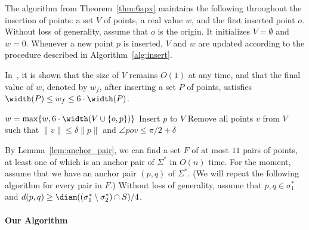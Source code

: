 \sixapx*




The algorithm from Theorem~\ref{thm:6apx} maintains the following throughout the insertion of points: a set $V$ of points, a real value $w$, and the first inserted point $o$.
Without loss of generality, assume that $o$ is the origin.
It initializes $V = \emptyset$ and $w = 0$.
Whenever a new point $p$ is inserted, $V$ and $w$ are updated according to the procedure described in Algorithm~\ref{alg:insert}.

In~\cite{chan2006faster}, it is shown that the size of $V$ remains $O(1)$ at any time, and that the final value of $w$, denoted by $w_f$, after inserting a set $P$ of points, satisfies $\width(P) \le w_f \le 6 \cdot \width(P)$.


\begin{algorithm}
\caption{Processing a new point $p$ (See the proof of Theorem A.3 in \cite{chan2006faster}. Let $\delta>0$ be a sufficiently small constant.)}
\label{alg:insert}
\begin{algorithmic}[1]
\State $w = \max \{w, 6\cdot \width(V \cup \{ o, p\} ) \}$ 
    \State Insert $p$ to $V$
    \State Remove all points $v$ from $V$ such that $\|v\| \le \delta \|p\|$ and $\angle pov \le \pi/2 + \delta$
\EndIf
\EndFunction
\end{algorithmic}
\end{algorithm}


\medbreak
By Lemma~\ref{lem:anchor_pair}, we can find a set $F$ of at most $11$ pairs of points, at least one of which is an anchor pair of $\Sigma^*$ in $O(n)$ time. 
For the moment, assume that we have an anchor pair $(p, q)$ of $\Sigma^*$. (We will repeat the following algorithm for every pair in $F$.)
Without loss of generality, assume that $p, q \in \sigma_1^*$ and $d(p, q) \ge \diam((\sigma_1^*\setminus \sigma_2^* ) \cap S)/4$. 







\paragraph*{Our Algorithm}





